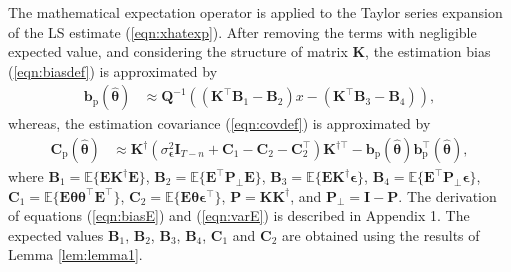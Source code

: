 The mathematical expectation operator is applied to the Taylor series expansion of the LS estimate (\ref{eqn:xhatexp}).
After removing the terms with negligible expected value, and considering the structure of matrix $\mathbf{K}$, the estimation bias (\ref{eqn:biasdef}) is approximated by 
\begin{equation} \begin{aligned} \mathbf{b}_{\mathrm{p}} \left( \widehat{\bm{\theta}} \right) & \approx \mathbf{Q}^{-1} \left( \left( \mathbf{K}^\top \mathbf{B}_1 - \mathbf{B}_2 \right) x - \left( \mathbf{K}^\top \mathbf{B}_3 - \mathbf{B}_4 \right) \right) , \end{aligned} \label{eqn:biasE} \end{equation}
whereas, the estimation covariance (\ref{eqn:covdef}) is approximated by 
\begin{equation} \begin{aligned} \mathbf{C}_{\mathrm{p}} \left( \widehat{\bm{\theta}} \right) & \approx \mathbf{K}^\dagger \left( \sigma_{\bm{\epsilon}}^2 \mathbf{I}_{T-n} + \mathbf{C}_1 - \mathbf{C}_2 - \mathbf{C}_2^\top \right) \mathbf{K}^{\dagger \top} - \mathbf{b}_{\mathrm{p}} \left( \widehat{\bm{\theta}} \right) \mathbf{b}_{\mathrm{p}}^\top \left( \widehat{\bm{\theta}} \right) , \end{aligned} \label{eqn:varE} \end{equation}
where $\mathbf{B}_1 = \mathbb{E} \Big\{ \mathbf{E} \mathbf{K}^\dagger \mathbf{E} \Big\}$, $\mathbf{B}_2 = \mathbb{E} \Big\{ \mathbf{E}^\top \mathbf{P}_\perp \mathbf{E} \Big\}$, $\mathbf{B}_3 = \mathbb{E} \Big\{ \mathbf{E} \mathbf{K}^\dagger \bm{\epsilon} \Big\}$, $\mathbf{B}_4 = \mathbb{E} \Big\{ \mathbf{E}^\top \mathbf{P}_\perp \bm{\epsilon} \Big\}$, $\mathbf{C}_1 = \mathbb{E} \Big\{ \mathbf{E} \bm{\theta} \bm{\theta}^\top \mathbf{E}^\top \Big\}$, $\mathbf{C}_2 = \mathbb{E} \Big\{ \mathbf{E} \bm{\theta} \bm{\epsilon}^\top \Big\}$, $\mathbf{P} = \mathbf{K} \mathbf{K}^\dagger$, and $\mathbf{P}_\perp = \mathbf{I} - \mathbf{P}$. 
The derivation of equations (\ref{eqn:biasE}) and (\ref{eqn:varE}) is described in Appendix 1.
The expected values $\mathbf{B}_1$, $\mathbf{B}_2$, $\mathbf{B}_3$, $\mathbf{B}_4$, $\mathbf{C}_1$ and $\mathbf{C}_2$ are obtained using the results of Lemma \ref{lem:lemma1}.



